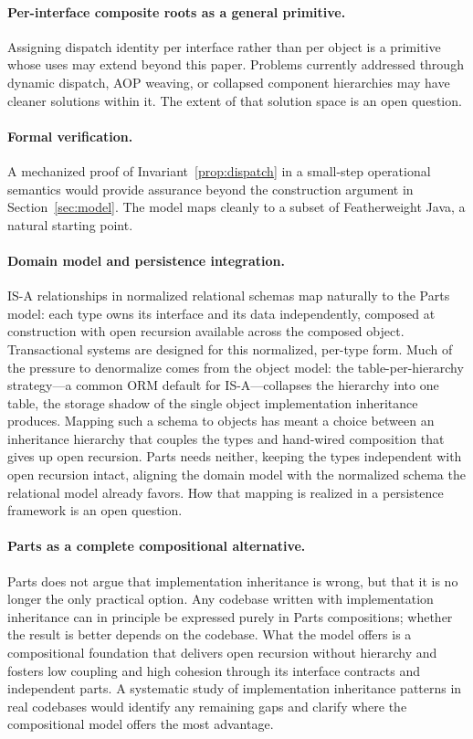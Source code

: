 \documentclass[sigplan,10pt,review,anonymous]{acmart}
\theoremstyle{acmplain}
\begin{document}
\paragraph{Per-interface composite roots as a general primitive.}
Assigning dispatch identity per interface rather than per object is a primitive
whose uses may extend beyond this paper. Problems currently addressed through dynamic dispatch, AOP weaving, or collapsed component hierarchies may have cleaner solutions within it. The extent of that solution space is an open question.

\paragraph{Formal verification.}
A mechanized proof of Invariant~\ref{prop:dispatch} in a small-step operational
semantics would provide assurance beyond the construction argument in Section~\ref{sec:model}. The
model maps cleanly to a subset of Featherweight Java, a natural starting point.

\paragraph{Domain model and persistence integration.}
IS-A relationships in normalized relational schemas map naturally to the
Parts model: each type owns its interface and its data independently,
composed at construction with open recursion available across the composed
object. Transactional systems are designed for this normalized, per-type
form. Much of the pressure to denormalize comes from the object model: the
table-per-hierarchy strategy---a common ORM default for IS-A---collapses the
hierarchy into one table, the storage shadow of the single object
implementation inheritance produces. Mapping such a schema to objects has
meant a choice between an inheritance hierarchy that couples the types and
hand-wired composition that gives up open recursion. Parts needs neither,
keeping the types independent with open recursion intact, aligning the domain
model with the normalized schema the relational model already favors. How that
mapping is realized in a persistence framework is an open question.

\paragraph{Parts as a complete compositional alternative.}
Parts does not argue that implementation inheritance is wrong, but that
it is no longer the only practical option. Any codebase written with
implementation inheritance can in principle be expressed purely in Parts
compositions; whether the result is better depends on the codebase. What
the model offers is a compositional foundation that delivers open recursion
without hierarchy and fosters low coupling and high cohesion through its
interface contracts and independent parts. A systematic study of implementation
inheritance patterns in real codebases would identify any remaining gaps
and clarify where the compositional model offers the most advantage.
\end{document}
